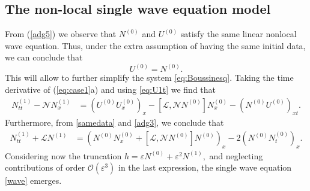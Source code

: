 \documentclass[final,11pt,a4paper,reqno]{amsart}
\theoremstyle{definition}
\begin{document}
\subsection{The non-local single wave equation model}\label{sec:nonlocalwave}
From (\ref{adg5}) we observe that $N^{(0)}$ and $U^{(0)}$ satisfy the same linear nonlocal wave equation. Thus, under the extra assumption of having the same initial data, we can conclude that
\begin{equation}\label{samedata}
U^{(0)}=N^{(0)}.
\end{equation}
This will allow to further simplify the system \eqref{eq:Boussinesq}. Taking the time derivative of  (\ref{eq:case1}a) and using \eqref{eq:U1t} we find that
\begin{align*}
N^{(1)}_{tt}-\mathscr{N}N^{(1)}_{x}&=(U^{(0)}U^{(0)}_{x})_{x}-\left[\mathscr{L},\mathscr{N}N^{(0)}\right]N^{(0)}_{x}-(N^{(0)}U^{(0)})_{xt}.
\end{align*}
Furthermore, from \eqref{samedata} and \eqref{adg3}, we conclude that
\begin{align*}
N^{(1)}_{tt}+\mathscr{L}N^{(1)}&=\left(N^{(0)}N^{(0)}_x+\left[\mathscr{L},\mathscr{N}N^{(0)}\right]N^{(0)}\right)_x-2\left(N^{(0)}N^{(0)}_t\right)_x.
\end{align*}
Considering now the truncation $h=\varepsilon N^{(0)}+\varepsilon^2 N^{(1)},$ and neglecting contributions of order $\mathcal{O}(\varepsilon^3)$ in the last expression, the single wave equation \eqref{wave} emerges.
\end{document}
